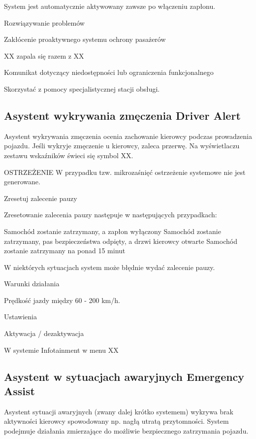 System jest automatycznie aktywowany zawsze po włączeniu zapłonu.

Rozwiązywanie problemów

Zakłócenie proaktywnego systemu ochrony pasażerów

XX zapala się razem z XX

Komunikat dotyczący niedostępności lub ograniczenia funkcjonalnego
\begin{itemizeArrow}
	\itemArrow Skorzystać z pomocy specjalistycznej stacji obsługi.
\end{itemizeArrow}

\subsection{Asystent wykrywania zmęczenia Driver Alert}

Asystent wykrywania zmęczenia ocenia zachowanie kierowcy podczas prowadzenia pojazdu. Jeśli wykryje zmęczenie u kierowcy, zaleca przerwę. Na wyświetlaczu zestawu wskaźników świeci się symbol XX.

OSTRZEŻENIE
W przypadku tzw. mikrozaśnięć ostrzeżenie systemowe nie jest generowane.

Zresetuj zalecenie pauzy

Zresetowanie zalecenia pauzy następuje w następujących przypadkach:
\begin{itemizeTriangle}
	\itemTriangle Samochód zostanie zatrzymany, a zapłon wyłączony
	\itemTriangle Samochód zostanie zatrzymany, pas bezpieczeństwa odpięty, a drzwi kierowcy otwarte
	\itemTriangle Samochód zostanie zatrzymany na ponad 15 minut
\end{itemizeTriangle}

W niektórych sytuacjach system może błędnie wydać zalecenie pauzy.

Warunki działania
\begin{itemizeTick}
	\itemTick Prędkość jazdy między 60 - 200 km/h.
\end{itemizeTick}

Ustawienia

Aktywacja / dezaktywacja

W systemie Infotainment w menu XX

\subsection{Asystent w sytuacjach awaryjnych Emergency Assist}

Asystent sytuacji awaryjnych (zwany dalej krótko systemem) wykrywa brak aktywności kierowcy spowodowany np. nagłą utratą przytomności. System podejmuje działania zmierzające do możliwie bezpiecznego zatrzymania pojazdu.

